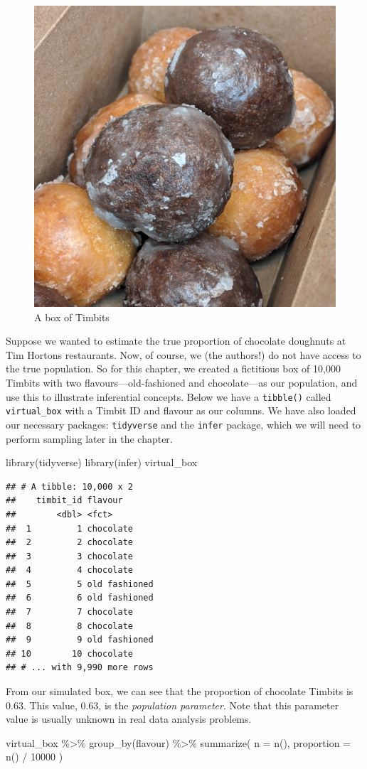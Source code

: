 \documentclass[
]{krantz}
\makeatletter
\newenvironment{Shaded}{\begin{snugshade}}{\end{snugshade}}
\newcommand{\AttributeTok}[1]{\textcolor[rgb]{0.61,0.61,0.61}{#1}}
\newcommand{\DecValTok}[1]{\textcolor[rgb]{0.06,0.06,0.06}{#1}}
\newcommand{\FunctionTok}[1]{\textcolor[rgb]{0,0,0}{#1}}
\newcommand{\NormalTok}[1]{#1}
\newcommand{\SpecialCharTok}[1]{\textcolor[rgb]{0,0,0}{#1}}
\newenvironment{kframe}{%
\medskip{}
\setlength{\fboxsep}{.8em}
 \def\at@end@of@kframe{}%
 \ifinner\ifhmode%
  \def\at@end@of@kframe{\end{minipage}}%
  \begin{minipage}{\columnwidth}%
 \fi\fi%
 \def\FrameCommand##1{\hskip\@totalleftmargin \hskip-\fboxsep
 \colorbox{shadecolor}{##1}\hskip-\fboxsep
     \hskip-\linewidth \hskip-\@totalleftmargin \hskip\columnwidth}%
 \MakeFramed {\advance\hsize-\width
   \@totalleftmargin\z@ \linewidth\hsize
   \@setminipage}}%
 {\par\unskip\endMakeFramed%
 \at@end@of@kframe}
\renewenvironment{Shaded}{\begin{kframe}}{\end{kframe}}
\makeatother
\begin{document}
\begin{figure}
\includegraphics[width=0.3\linewidth]{img/timbits} \caption{A box of Timbits}\label{fig:11-timbits-picture}
\end{figure}

Suppose we wanted to estimate the true proportion of chocolate doughnuts at Tim
Hortons restaurants. Now, of course, we (the authors!) do not have access to the true population.
So for this chapter, we created a fictitious box of 10,000 Timbits with two flavours---old-fashioned
and chocolate---as our population, and use this to illustrate
inferential concepts. Below we have a \texttt{tibble()} called \texttt{virtual\_box} with a Timbit ID and flavour as our columns. We have also loaded our necessary packages: \texttt{tidyverse} and the \texttt{infer} package, which we will need to perform sampling later in the chapter.

\begin{Shaded}
\begin{Highlighting}[]
\FunctionTok{library}\NormalTok{(tidyverse)}
\FunctionTok{library}\NormalTok{(infer)}
\NormalTok{virtual\_box}
\end{Highlighting}
\end{Shaded}

\begin{verbatim}
## # A tibble: 10,000 x 2
##    timbit_id flavour      
##        <dbl> <fct>        
##  1         1 chocolate    
##  2         2 chocolate    
##  3         3 chocolate    
##  4         4 chocolate    
##  5         5 old fashioned
##  6         6 old fashioned
##  7         7 chocolate    
##  8         8 chocolate    
##  9         9 old fashioned
## 10        10 chocolate    
## # ... with 9,990 more rows
\end{verbatim}

From our simulated box, we can see that the proportion of chocolate Timbits is
0.63. This value, 0.63, is the \emph{population parameter}. Note that this parameter value is usually unknown in real data analysis problems.

\begin{Shaded}
\begin{Highlighting}[]
\NormalTok{virtual\_box }\SpecialCharTok{\%\textgreater{}\%}
  \FunctionTok{group\_by}\NormalTok{(flavour) }\SpecialCharTok{\%\textgreater{}\%}
  \FunctionTok{summarize}\NormalTok{(}
    \AttributeTok{n =} \FunctionTok{n}\NormalTok{(),}
    \AttributeTok{proportion =} \FunctionTok{n}\NormalTok{() }\SpecialCharTok{/} \DecValTok{10000}
\NormalTok{  )}
\end{Highlighting}
\end{Shaded}
\end{document}

